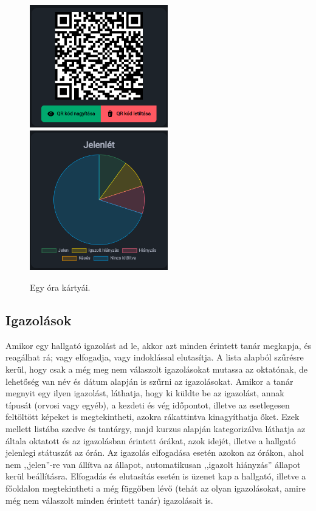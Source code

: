 \documentclass[
]{thesis-ekf}
\theoremstyle{definition}
\theoremstyle{remark}
\begin{document}
\begin{figure}[ht!]
	\centering
	\includegraphics[width=6cm]{../pictures/screenshots/class_2.png}
	\includegraphics[width=6cm]{../pictures/screenshots/class_3.png}
	\caption{Egy óra kártyái.}
	\label{class2}
\end{figure}

\subsection{Igazolások}

Amikor egy hallgató igazolást ad le, akkor azt minden érintett tanár megkapja, és reagálhat rá; vagy elfogadja, vagy indoklással elutasítja. A lista alapból szűrésre kerül, hogy csak a még meg nem válaszolt igazolásokat mutassa az oktatónak, de lehetőség van név és dátum alapján is szűrni az igazolásokat. Amikor a tanár megnyit egy ilyen igazolást, láthatja, hogy ki küldte be az igazolást, annak típusát (orvosi vagy egyéb), a kezdeti és vég időpontot, illetve az esetlegesen feltöltött képeket is megtekintheti, azokra rákattintva kinagyíthatja őket. Ezek mellett listába szedve és tantárgy, majd kurzus alapján kategorizálva láthatja az általa oktatott és az igazolásban érintett órákat, azok idejét, illetve a hallgató jelenlegi státuszát az órán. Az igazolás elfogadása esetén azokon az órákon, ahol nem ,,jelen''-re van állítva az állapot, automatikusan ,,igazolt hiányzás'' állapot kerül beállításra. Elfogadás és elutasítás esetén is üzenet kap a hallgató, illetve a főoldalon megtekintheti a még függőben lévő (tehát az olyan igazolásokat, amire még nem válaszolt minden érintett tanár) igazolásait is.
\end{document}

